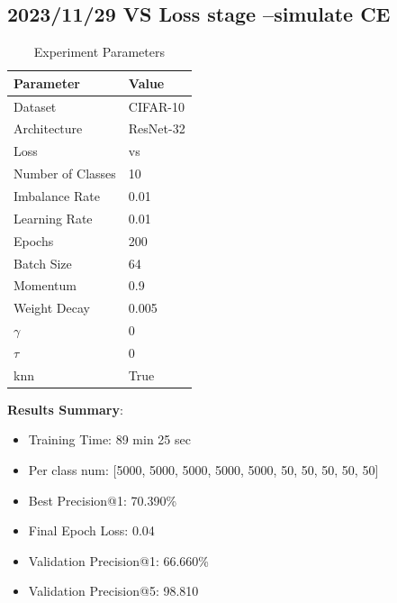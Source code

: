 \documentclass{article}
\begin{document}
\begin{multicols}{2} %
\section{2023/11/29 VS Loss stage --simulate CE}
\begin{table}[H]
\centering
\caption{Experiment Parameters}
\label{tab:parameters}
\begin{tabular}{ll}
\toprule
Parameter & Value \\
\midrule
Dataset & CIFAR-10 \\
Architecture & ResNet-32 \\
Loss & vs \\
Number of Classes & 10 \\
Imbalance Rate & 0.01 \\
Learning Rate & 0.01 \\
Epochs & 200 \\
Batch Size & 64 \\
Momentum & 0.9 \\
Weight Decay & 0.005 \\
$\gamma$ & 0\\
$\tau$ & 0\\
knn & True \\
\bottomrule
\end{tabular}
\end{table}

\textbf{Results Summary}:
\begin{itemize}
    \item Training Time: 89 min 25 sec
    \item Per class num: [5000, 5000, 5000, 5000, 5000, 50, 50, 50, 50, 50]
    \item Best Precision@1: 70.390\%  
    \item Final Epoch Loss: 0.04 
    \item Validation Precision@1: 66.660\%
    \item Validation Precision@5: 98.810%
\end{itemize}


\end{multicols}
\end{document}
